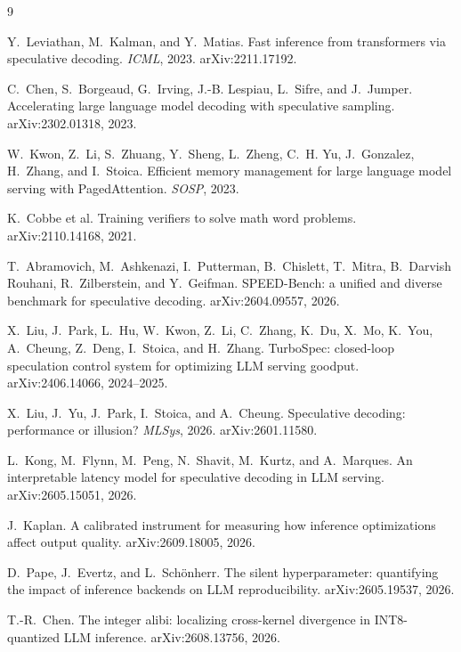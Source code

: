 \documentclass[11pt]{article}
\begin{document}
\begin{thebibliography}{9}\small

Y.~Leviathan, M.~Kalman, and Y.~Matias.
\newblock Fast inference from transformers via speculative decoding.
\newblock \emph{ICML}, 2023. arXiv:2211.17192.

C.~Chen, S.~Borgeaud, G.~Irving, J.-B. Lespiau, L.~Sifre, and J.~Jumper.
\newblock Accelerating large language model decoding with speculative sampling.
\newblock arXiv:2302.01318, 2023.

W.~Kwon, Z.~Li, S.~Zhuang, Y.~Sheng, L.~Zheng, C.~H. Yu, J.~Gonzalez,
H.~Zhang, and I.~Stoica.
\newblock Efficient memory management for large language model serving with
PagedAttention.
\newblock \emph{SOSP}, 2023.

K.~Cobbe et al.
\newblock Training verifiers to solve math word problems.
\newblock arXiv:2110.14168, 2021.

T.~Abramovich, M.~Ashkenazi, I.~Putterman, B.~Chislett, T.~Mitra,
B.~Darvish Rouhani, R.~Zilberstein, and Y.~Geifman.
\newblock SPEED-Bench: a unified and diverse benchmark for speculative
decoding.
\newblock arXiv:2604.09557, 2026.

X.~Liu, J.~Park, L.~Hu, W.~Kwon, Z.~Li, C.~Zhang, K.~Du, X.~Mo, K.~You,
A.~Cheung, Z.~Deng, I.~Stoica, and H.~Zhang.
\newblock TurboSpec: closed-loop speculation control system for optimizing
LLM serving goodput.
\newblock arXiv:2406.14066, 2024--2025.

X.~Liu, J.~Yu, J.~Park, I.~Stoica, and A.~Cheung.
\newblock Speculative decoding: performance or illusion?
\newblock \emph{MLSys}, 2026. arXiv:2601.11580.

L.~Kong, M.~Flynn, M.~Peng, N.~Shavit, M.~Kurtz, and A.~Marques.
\newblock An interpretable latency model for speculative decoding in LLM
serving.
\newblock arXiv:2605.15051, 2026.

J.~Kaplan.
\newblock A calibrated instrument for measuring how inference optimizations
affect output quality.
\newblock arXiv:2609.18005, 2026.

D.~Pape, J.~Evertz, and L.~Sch\"onherr.
\newblock The silent hyperparameter: quantifying the impact of inference
backends on LLM reproducibility.
\newblock arXiv:2605.19537, 2026.

T.-R.~Chen.
\newblock The integer alibi: localizing cross-kernel divergence in
INT8-quantized LLM inference.
\newblock arXiv:2608.13756, 2026.


\end{thebibliography}
\end{document}
